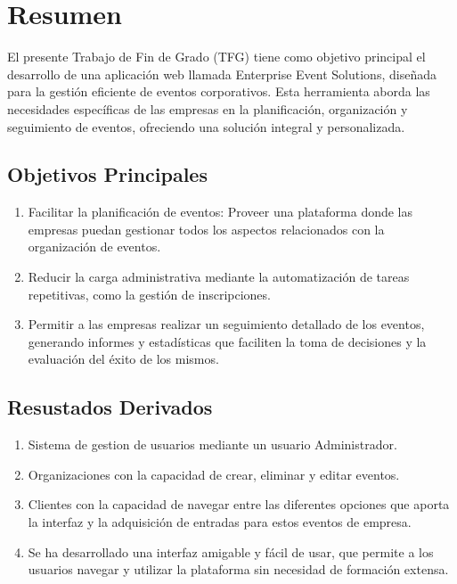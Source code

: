 \documentclass[12pt,twoside,titlepage]{report}
\begin{document}







\chapter*{Resumen}

El presente Trabajo de Fin de Grado (TFG) tiene como objetivo principal el desarrollo de una aplicación web llamada Enterprise Event Solutions, 
diseñada para la gestión eficiente de eventos corporativos. Esta herramienta aborda las necesidades específicas de las empresas en la planificación, 
organización y seguimiento de eventos, ofreciendo una solución integral y personalizada.

\section*{Objetivos Principales}
\begin{enumerate}
    \item Facilitar la planificación de eventos: Proveer una plataforma donde las empresas puedan gestionar todos los 
    aspectos relacionados con la organización de eventos.
    \item Reducir la carga administrativa mediante la automatización de tareas repetitivas, como la gestión de inscripciones. 
    \item Permitir a las empresas realizar un seguimiento detallado de los eventos, generando informes y estadísticas que 
    faciliten la toma de decisiones y la evaluación del éxito de los mismos.
    \end{enumerate}

\section*{Resustados Derivados}
\begin{enumerate}
    \item Sistema de gestion de usuarios mediante un usuario Administrador.
    \item Organizaciones con la capacidad de crear, eliminar y editar eventos.
    \item Clientes con la capacidad de navegar entre las diferentes opciones que aporta la interfaz y la adquisición de entradas para estos eventos de empresa.
    \item Se ha desarrollado una interfaz amigable y fácil de usar, que permite a los usuarios navegar y 
    utilizar la plataforma sin necesidad de formación extensa.
    \end{enumerate}
\end{document}
